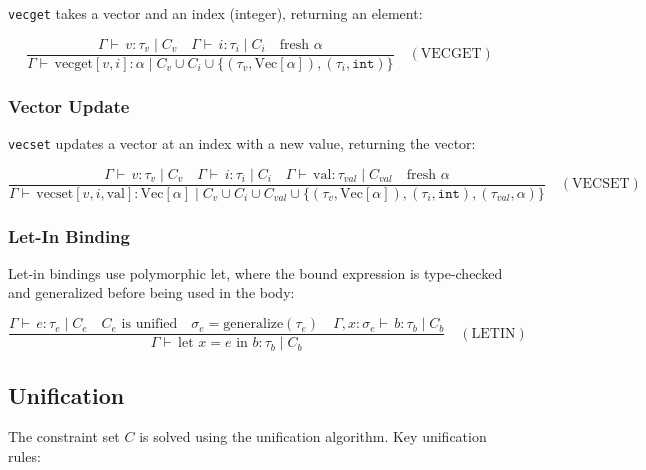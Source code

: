 \documentclass[12pt]{article}
\newcommand{\judge}[1]{\vdash \, #1}
\newcommand{\env}{\Gamma}
\newcommand{\type}{\tau}
\begin{document}
\texttt{vecget} takes a vector and an index (integer), returning an element:

\begin{equation*}
\frac{
  \env \judge{v : \type_v \mid C_v}
  \quad
  \env \judge{i : \type_i \mid C_i}
  \quad
  \text{fresh } \alpha
}{
  \env \judge{\text{vecget}[v, i] : \alpha \mid C_v \cup C_i \cup \{(\type_v, \text{Vec}[\alpha]), (\type_i, \mathtt{int})\}}
}
\quad (\text{VECGET})
\end{equation*}

\subsubsection{Vector Update}

\texttt{vecset} updates a vector at an index with a new value, returning the vector:

\begin{equation*}
\frac{
  \env \judge{v : \type_v \mid C_v}
  \quad
  \env \judge{i : \type_i \mid C_i}
  \quad
  \env \judge{\text{val} : \type_{val} \mid C_{val}}
  \quad
  \text{fresh } \alpha
}{
  \env \judge{\text{vecset}[v, i, \text{val}] : \text{Vec}[\alpha] \mid C_v \cup C_i \cup C_{val} \cup \{(\type_v, \text{Vec}[\alpha]), (\type_i, \mathtt{int}), (\type_{val}, \alpha)\}}
}
\quad (\text{VECSET})
\end{equation*}

\subsubsection{Let-In Binding}

Let-in bindings use polymorphic let, where the bound expression is type-checked and generalized before being used in the body:

\begin{equation*}
\frac{
  \env \judge{e : \type_e \mid C_e}
  \quad
  C_e \text{ is unified}
  \quad
  \sigma_e = \text{generalize}(\type_e)
  \quad
  \env, x : \sigma_e \judge{b : \type_b \mid C_b}
}{
  \env \judge{\text{let } x = e \text{ in } b : \type_b \mid C_b}
}
\quad (\text{LETIN})
\end{equation*}

\subsection{Unification}

The constraint set $C$ is solved using the unification algorithm. Key unification rules:
\end{document}

